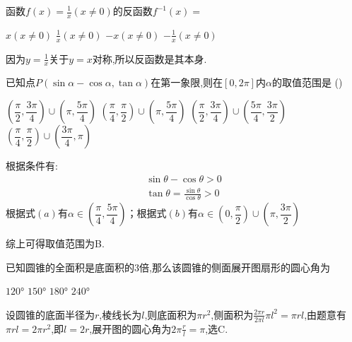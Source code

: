 \begin{questions}
	\question 函数$f(x)=\frac1x(x\neq0)$的反函数$f^{-1}(x)=$ \hfs

	\begin{oneparchoices}
		\choice $x ( x\neq0)$ \CorrectChoice $\frac1x(x\neq0)$ \choice $-x (x\neq0)$ \choice $-\frac1x (x\neq0)$
	\end{oneparchoices}
	\begin{solution}
		因为$y=\frac1x$关于$y=x$对称,所以反函数是其本身.
	\end{solution}

	\question 已知点$P(\sin\alpha-\cos\alpha, \tan\alpha)$在第一象限,则在$[0,2\pi]$内$\alpha$的取值范围是 \hfill
	(\hspace{1cm})

	\begin{choices}
		\choice $\left( \dfrac{\pi}{2}, \dfrac{3\pi}{4} \right) \cup \left( \pi, \dfrac{5\pi}{4} \right)$
		\CorrectChoice $\left( \dfrac{\pi}{4}, \dfrac{\pi}{2} \right) \cup \left( \pi, \dfrac{5\pi}{4} \right)$
		\choice $\left( \dfrac{\pi}{2}, \dfrac{3\pi}{4} \right) \cup \left( \dfrac{5\pi}{4}, \dfrac{3\pi}{2} \right)$
		\choice $\left( \dfrac{\pi}{4}, \dfrac{\pi}{2} \right) \cup \left( \dfrac{3\pi}{4}, \pi \right)$
	\end{choices}

	\begin{solution}
		根据条件有:
		\begin{align*}
			\sin\theta - \cos\theta > 0 \tag{a} \\
			\tan\theta = \frac{\sin\theta}{\cos\theta} > 0 \tag{b}
		\end{align*}
		根据式$(a)$有$\alpha \in \left( \dfrac{\pi}{4}, \dfrac{5\pi}{4} \right)$；根据式$(b)$有$\alpha \in \left( 0,
			\dfrac{\pi}{2} \right) \cup \left( \pi, \dfrac{3\pi}{2} \right)$

		综上可得取值范围为B.
	\end{solution}

	\question 已知圆锥的全面积是底面积的$3$倍,那么该圆锥的侧面展开图扇形的圆心角为\hfs

	\begin{oneparchoices}
		\choice $\ang{120}$
		\choice $\ang{150}$
		\CorrectChoice $\ang{180}$
		\choice $\ang{240}$
	\end{oneparchoices}

	\begin{solution}
		设圆锥的底面半径为$r$,棱线长为$l$,则底面积为$\pi r^2$,侧面积为$\frac{2\pi r}{2\pi l}\pi l^2 = \pi
			rl$,由题意有$\pi rl = 2\pi r^2$,即$l=2r$,展开图的圆心角为$2\pi\frac{r}{l}=\pi$,选C.
	\end{solution}


\end{questions}
